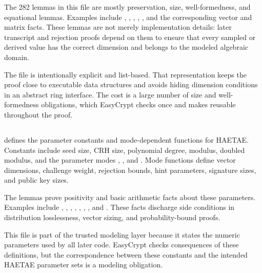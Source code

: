 The 282 lemmas in this file are mostly preservation, size, well-formedness, and
equational lemmas.  Examples include ,
, ,
, , and the corresponding vector and
matrix facts.  These lemmas are not merely implementation details: later
transcript and rejection proofs depend on them to ensure that every sampled or
derived value has the correct dimension and belongs to the modeled algebraic
domain.

The file is intentionally explicit and list-based.  That representation keeps
the proof close to executable data structures and avoids hiding dimension
conditions in an abstract ring interface.  The cost is a large number of size and
well-formedness obligations, which EasyCrypt checks once and makes reusable
throughout the proof.

\subsection[HAETAE\_Params.ec]{\texorpdfstring{}{HAETAE\_Params.ec}}

 defines the parameter constants and mode-dependent
functions for HAETAE.  Constants include seed size, CRH size, polynomial degree,
modulus, doubled modulus, and the parameter modes ,
, and .  Mode functions define vector dimensions,
challenge weight, rejection bounds, hint parameters, signature sizes, and public
key sizes.

The lemmas prove positivity and basic arithmetic facts about these parameters.
Examples include , ,
, , ,
, , and
.  These facts discharge side conditions in
distribution losslessness, vector sizing, and probability-bound proofs.

This file is part of the trusted modeling layer because it states the numeric
parameters used by all later code.  EasyCrypt checks consequences of these
definitions, but the correspondence between these constants and the intended
HAETAE parameter sets is a modeling obligation.

\subsection[HAETAE\_FIPS202.ec]{\texorpdfstring{}{HAETAE\_FIPS202.ec}}

